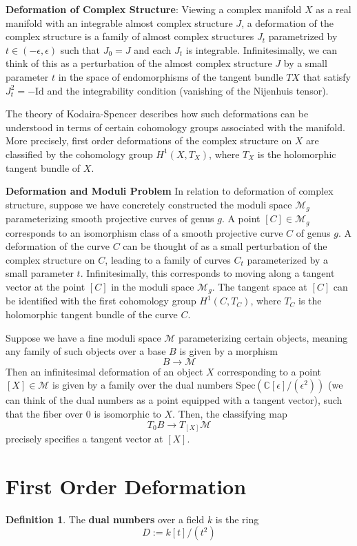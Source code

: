 \documentclass{article}
\theoremstyle{definition}
\theoremstyle{definition}
\newtheorem{definition}{Definition}[theorem]
\theoremstyle{definition}
\theoremstyle{definition}
\theoremstyle{definition}
\theoremstyle{definition}
\theoremstyle{definition}
\begin{document}
\textbf{Deformation of Complex Structure}: Viewing a complex manifold $X$ as a real manifold with an integrable almost complex structure $J$, a deformation of the complex structure is a family of almost complex structures $J_t$ parametrized by $t\in (-\epsilon, \epsilon)$ such that $J_0 = J$ and each $J_t$ is integrable. Infinitesimally, we can think of this as a perturbation of the almost complex structure $J$ by a small parameter $t$ in the space of endomorphisms of the tangent bundle $TX$ that satisfy $J_t^2 = -\mathrm{Id}$ and the integrability condition (vanishing of the Nijenhuis tensor).


The theory of Kodaira-Spencer describes how such deformations can be understood in terms of certain cohomology groups associated with the manifold. More precisely, first order deformations of the complex structure on $X$ are classified by the cohomology group $H^1(X, T_X)$, where $T_X$ is the holomorphic tangent bundle of $X$.





\textbf{Deformation and Moduli Problem}
In relation to deformation of complex structure, suppose we have concretely constructed the moduli space $\mathcal{M}_g$ parameterizing smooth projective curves of genus $g$. A point $[C]\in \mathcal{M}_g$ corresponds to an isomorphism class of a smooth projective curve $C$ of genus $g$. A deformation of the curve $C$ can be thought of as a small perturbation of the complex structure on $C$, leading to a family of curves $C_t$ parameterized by a small parameter $t$. Infinitesimally, this corresponds to moving along a tangent vector at the point $[C]$ in the moduli space $\mathcal{M}_g$. The tangent space at $[C]$ can be identified with the first cohomology group $H^1(C, T_C)$, where $T_C$ is the holomorphic tangent bundle of the curve $C$.

Suppose we have a fine moduli space $\mathcal{M}$ parameterizing certain objects, meaning any family of such objects over a base $B$ is given by a morphism 
\[B\to \mathcal{M}\]
Then an infinitesimal deformation of an object $X$ corresponding to a point $[X]\in \mathcal{M}$ is given by a family over the dual numbers $\mathrm{Spec}(\mathbb{C}[\epsilon]/(\epsilon^2))$ (we can think of the dual numbers as a point equipped with a tangent vector), such that the fiber over $0$ is isomorphic to $X$. Then, the classifying map 
\[T_0B\to T_{[X]}\mathcal{M}\]
precisely specifies a tangent vector at $[X]$.

\newpage
\section{First Order Deformation}
\begin{definition}
	The \textbf{dual numbers} over a field $k$ is the ring 
	\[D:= k[t]/(t^2)\]
\end{definition} 
\end{document}
